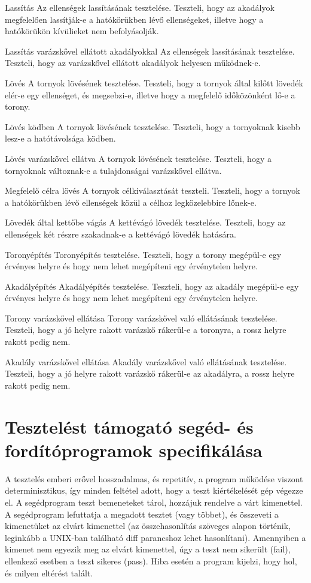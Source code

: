 \teszteset
{Lassítás}
{Az ellenségek lassításának tesztelése.}
{Teszteli, hogy az akadályok megfelelően lassítják-e a hatókörükben lévő ellenségeket, illetve hogy a hatókörükön kívülieket nem befolyásolják.}

\teszteset
{Lassítás varázskővel ellátott akadályokkal}
{Az ellenségek lassításának tesztelése.}
{Teszteli, hogy az varázskővel ellátott akadályok helyesen működnek-e.}

\teszteset
{Lövés}
{A tornyok lövésének tesztelése.}
{Teszteli, hogy a tornyok által kilőtt lövedék elér-e egy ellenséget, és megsebzi-e, illetve hogy a megfelelő időközönként lő-e a torony.}

\teszteset
{Lövés ködben}
{A tornyok lövésének tesztelése.}
{Teszteli, hogy a tornyoknak kisebb lesz-e a hatótávolsága ködben.}

\teszteset
{Lövés varázskővel ellátva}
{A tornyok lövésének tesztelése.}
{Teszteli, hogy a tornyoknak változnak-e a tulajdonságai varázskővel ellátva.}

\teszteset
{Megfelelő célra lövés}
{A tornyok célkiválasztását teszteli.}
{Teszteli, hogy a tornyok a hatókörükben lévő ellenségek közül a célhoz legközelebbire lőnek-e.}

\teszteset
{Lövedék által kettőbe vágás}
{A kettévágó lövedék tesztelése.}
{Teszteli, hogy az ellenségek két részre szakadnak-e a kettévágó lövedék hatására.}

\teszteset
{Toronyépítés}
{Toronyépítés tesztelése.}
{Teszteli, hogy a torony megépül-e egy érvényes helyre és hogy nem lehet megépíteni egy érvénytelen helyre.}

\teszteset
{Akadályépítés}
{Akadályépítés tesztelése.}
{Teszteli, hogy az akadály megépül-e egy érvényes helyre és hogy nem lehet megépíteni egy érvénytelen helyre.}

\teszteset
{Torony varázskővel ellátása}
{Torony varázskővel való ellátásának tesztelése.}
{Teszteli, hogy a jó helyre rakott varázskő rákerül-e a toronyra, a rossz helyre rakott pedig nem.}

\teszteset
{Akadály varázskővel ellátása}
{Akadály varázskővel való ellátásának tesztelése.}
{Teszteli, hogy a jó helyre rakott varázskő rákerül-e az akadályra, a rossz helyre rakott pedig nem.}

\section{Tesztelést támogató segéd- és fordítóprogramok specifikálása}
A tesztelés emberi erővel hosszadalmas, és repetitív, a program működése viszont determinisztikus, így minden feltétel adott, hogy a teszt kiértékelését gép végezze el. A segédprogram teszt bemeneteket tárol, hozzájuk rendelve a várt kimenettel. A segédprogram lefuttatja a megadott tesztet (vagy többet), és összeveti a kimenetüket az elvárt kimenettel (az összehasonlítás szöveges alapon történik, leginkább a UNIX-ban található diff parancshoz lehet hasonlítani). Amennyiben a kimenet nem egyezik meg az elvárt kimenettel, úgy a teszt nem sikerült (fail), ellenkező esetben a teszt sikeres (pass). Hiba esetén a program kijelzi, hogy hol, és milyen eltérést talált.

